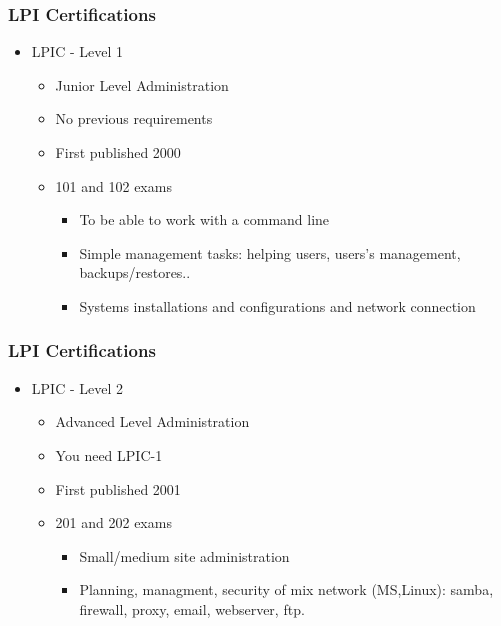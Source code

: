 \documentclass{beamer}
\begin{document}

\begin{frame}
\frametitle{LPI Certifications}
\begin{itemize}
\item LPIC - Level 1
    \begin{itemize}
    \item Junior Level Administration
    \item No previous requirements
    \item First published 2000 
    \item 101 and 102 exams
    	\begin{itemize}
	\item To be able to work with a command line
	\item Simple management tasks: helping users, users's management, backups/restores..	
	\item Systems installations and configurations and network connection 
	\end{itemize}
    \end{itemize}
\end{itemize}
\end{frame}

\begin{frame}
\frametitle{LPI Certifications}
\begin{itemize}
\item LPIC - Level 2
    \begin{itemize}
    \item Advanced Level Administration
    \item You need LPIC-1
    \item First published 2001 
    \item 201 and 202 exams
	\begin{itemize}
	\item Small/medium site administration
	\item Planning, managment, security of mix network (MS,Linux): samba, firewall, proxy, email, webserver, ftp.
	\end{itemize}
    \end{itemize}
\end{itemize}
\end{frame}
\end{document}
